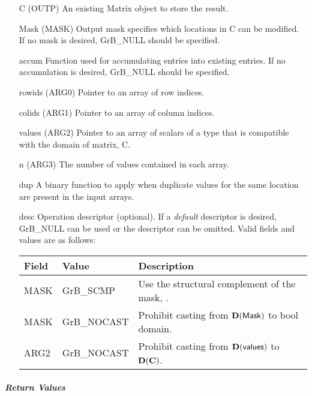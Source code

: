 \begin{itemize}[leftmargin=1.1in]
    \item[{\sf C}]      ({\sf OUTP}) An existing Matrix object to store the result.
    \item[{\sf Mask}]   ({\sf MASK}) Output mask specifies which locations in
                        {\sf C} can be modified.  If no mask is desired,
	                    {\sf GrB\_NULL} should be specified.
	\item[{\sf accum}]  Function used for accumulating entries into existing
                         entries. If no accumulation is desired,
	                    {\sf GrB\_NULL} should be specified.
	\item[{\sf rowids}] ({\sf ARG0}) Pointer to an array of row indices. 
	\item[{\sf colids}] ({\sf ARG1}) Pointer to an array of column indices. 
	\item[{\sf values}] ({\sf ARG2}) Pointer to an array of scalars of a type that
                                     is compatible with the domain of matrix, {\sf C}.
    \item[{\sf n}]      ({\sf ARG3}) The number of values contained in each array.
    \item[{\sf dup}]    A binary function to apply when duplicate values for
                        the same location are present in the input arrays.
                                     
    \item[{\sf desc}]   Operation descriptor (optional). If a
	\emph{default} descriptor is desired, {\sf GrB\_NULL} can be
	used or the descriptor can be omitted.  Valid fields and values are as follows: \\
    \begin{tabular}{lll}
    Field  & Value & Description \\
    \hline
    {\sf MASK} & {\sf GrB\_SCMP}   & Use the structural complement of the mask, . \\
    {\sf MASK} & {\sf GrB\_NOCAST} & Prohibit casting from $\bold{D}({\sf Mask})$ to {\sf bool} domain. \\
    {\sf ARG2} & {\sf GrB\_NOCAST} & Prohibit casting from $\bold{D}({\sf values})$ to $\bold{D}({\bf C})$. \\
    \end{tabular}
\end{itemize}

\subparagraph{Return Values}

